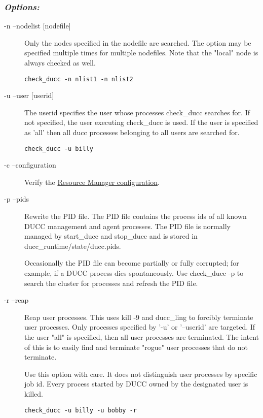      \subsubsection{\em{Options:}}
         \begin{description}
           \item[-n --nodelist {[nodefile]}]
             Only the nodes specified in the nodefile are searched. The option may be specified 
             multiple times for multiple nodefiles. Note that the "local" node is always checked as well. 
\begin{verbatim}
check_ducc -n nlist1 -n nlist2 
\end{verbatim}
             
           \item[-u --user {[userid]}]
             The userid specifies the user whose processes check\_ducc searches for. If not specified, the 
             user executing check\_ducc is used. If the user is specified as 'all' then all ducc processes 
             belonging to all users are searched for. 
\begin{verbatim}
check_ducc -u billy 
\end{verbatim}
          
           \item[-c --configuration]
             Verify the \hyperref[sec:ducc.classes]{Resource Manager configuration}.

           \item[-p --pids]
               
               Rewrite the PID file. The PID file contains the process ids of all known DUCC 
               management and agent processes. The PID file is normally managed by start\_ducc and 
               stop\_ducc and is stored in ducc\_runtime/state/ducc.pids. 
               
               Occasionally the PID file can become partially or fully corrupted; for example, if a DUCC 
               process dies spontaneously. Use check\_ducc -p to search the cluster for processes and 
               refresh the PID file. 
               
             \item[-r --reap]

               Reap user processes. This uses kill -9 and ducc\_ling to forcibly terminate user processes. 
               Only processes specified by '-u' or '--userid' are targeted. If the user "all" is specified, then 
               all user processes are terminated. The intent of this is to easily find and terminate "rogue" 
               user processes that do not terminate. 
               
               Use this option with care. It does not distinguish user processes by specific job id. Every 
               process started by DUCC owned by the designated user is killed. 

\begin{verbatim}
check_ducc -u billy -u bobby -r 
\end{verbatim}
           \end{description}               
       
